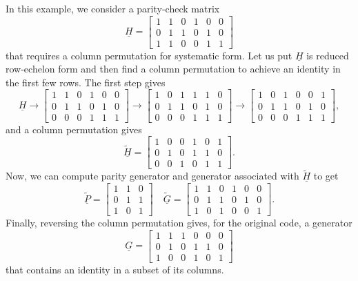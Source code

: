 \begin{example}
In this example, we consider a parity-check matrix
\[ \underline{H} =\left[\begin{array}{cccccc}
1 & 1 & 0 & 1 & 0 & 0\\
0 & 1 & 1 & 0 & 1 & 0\\
1 & 1 & 0 & 0 & 1 & 1\end{array}\right] \]
that requires a column permutation for systematic form.
Let us put $\underline{H}$ is reduced row-echelon form and then find a column permutation to achieve an identity in the first few rows.
The first step gives
\[ \underline{H} \rightarrow\left[\begin{array}{cccccc}
1 & 1 & 0 & 1 & 0 & 0\\
0 & 1 & 1 & 0 & 1 & 0\\
0 & 0 & 0 & 1 & 1 & 1\end{array}\right]\rightarrow\left[\begin{array}{cccccc}
1 & 0 & 1 & 1 & 1 & 0\\
0 & 1 & 1 & 0 & 1 & 0\\
0 & 0 & 0 & 1 & 1 & 1\end{array}\right]
\rightarrow\left[\begin{array}{cccccc}
1 & 0 & 1 & 0 & 0 & 1\\
0 & 1 & 1 & 0 & 1 & 0\\
0 & 0 & 0 & 1 & 1 & 1\end{array}\right], \]
and a column permutation gives
\[ \tilde{\underline{H}}=\left[\begin{array}{cccccc}
1 & 0 & 0 & 1 & 0 & 1\\
0 & 1 & 0 & 1 & 1 & 0\\
0 & 0 & 1 & 0 & 1 & 1\end{array}\right]. \]
Now, we can compute parity generator and generator associated with $\tilde{\underline{H}}$ to get
\[ \tilde{\underline{P}}=\left[\begin{array}{ccc}
1 & 1 & 0\\
0 & 1 & 1\\
1 & 0 & 1\end{array}\right] \quad 
\tilde{\underline{G}}=\left[\begin{array}{cccccc}
1 & 1 & 0 & 1 & 0 & 0\\
0 & 1 & 1 & 0 & 1 & 0\\
1 & 0 & 1 & 0 & 0 & 1\end{array}\right]. \]
Finally, reversing the column permutation gives, for the original code, a generator
\[\underline{G}=\left[\begin{array}{cccccc}
1 & 1 & 1 & 0 & 0 & 0\\
0 & 1 & 0 & 1 & 1 & 0\\
1 & 0 & 0 & 1 & 0 & 1\end{array}\right]  \]
that contains an identity in a subset of its columns.
\end{example}

